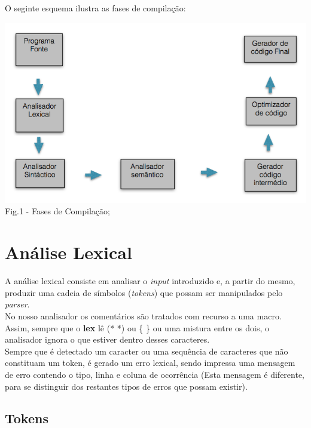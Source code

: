 \documentclass[12pt]{article}
\begin{document}
\indent 

\noindent O seginte esquema ilustra as fases de compilação:

\begin{center}
\includegraphics[scale=.7]{fases_de_compilacao.png}\\
Fig.1 - Fases de Compilação;
\end{center}

\newpage


\section{Análise Lexical}
\indent A análise lexical consiste em analisar o \textit{input} introduzido e, a partir do mesmo, produzir uma cadeia de símbolos (\textit{tokens}) que possam ser manipulados pelo \textit{parser}.\\
\indent 
\indent No nosso analisador os comentários são tratados com recurso a uma macro. Assim, sempre que o \textbf{lex} lê (*  *) ou \{ \} ou uma mistura entre os dois, o analisador ignora o que estiver dentro desses caracteres.\\
\indent Sempre que é detectado um caracter ou uma sequência de caracteres que não constituam um token, é gerado um erro lexical, sendo impressa uma mensagem de erro contendo o tipo, linha e coluna de ocorrência (Esta mensagem é diferente, para se distinguir dos restantes tipos de erros que possam existir).


\subsection{Tokens}
\end{document}
